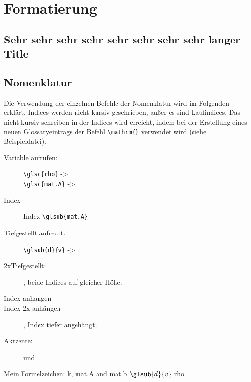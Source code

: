 %
\chapter{Formatierung}
\label{chap:Formatierung}

\section[Kurzer Title]{Sehr sehr sehr sehr sehr sehr sehr sehr langer Title}
\label{sec:Title}


\section{Nomenklatur}
\label{sec:nomenklatur}
Die Verwendung der einzelnen Befehle der Nomenklatur wird im Folgenden erklärt. 
Indices werden nicht kursiv geschrieben, außer es sind Laufindices. Das nicht kursiv schreiben in der Indices wird erreicht, indem bei der Erstellung eines neuen Glossaryeintrags der Befehl \verb=\mathrm{}= verwendet wird (siehe Beispieldatei).  


\begin{description}
	\item[Variable aufrufen:] \verb=\glsc{rho}= -> \\
						\verb=\glsc{mat.A}= -> 
	\item[Index] Index \verb=\glsub{mat.A}=
	\item[Tiefgestellt aufrecht:]  \verb== -> \glsub{d}{v}.
	\item[2xTiefgestellt:]  , beide Indices auf gleicher Höhe.
	\item[Index anhängen] 
	\item[Index 2x anhängen]  , Index tiefer angehängt.
	\item[Aktzente:]  und 
\end{description}

Mein Formelzeichen:   \gls{k}, \gls{mat.A} and \gls{mat.b} $\glsub{d}{v}$ 
		  \gls{rho}%

